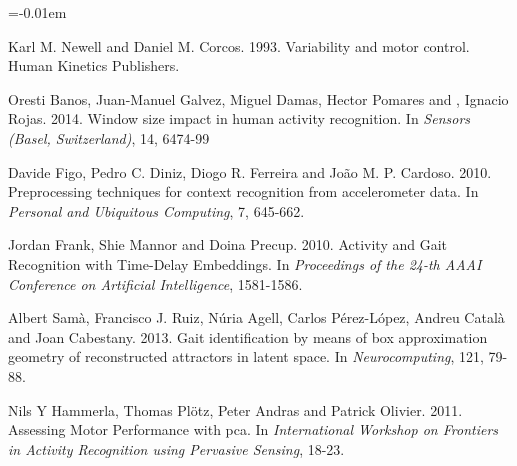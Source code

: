\documentclass[a0paper,portrait]{baposter}
\begin{document}
\begin{poster}
{\begin{thebibliography}{1}
\itemsep=-0.01em
\setlength{\baselineskip}{0.4em}

  Karl M. Newell and Daniel M. Corcos. 1993.
  \newblock Variability and motor control.
  \newblock Human Kinetics Publishers.
  
  
   Oresti Banos, Juan-Manuel Galvez, Miguel Damas, Hector Pomares and , Ignacio Rojas. 2014.
   \newblock Window size impact in human activity recognition.
   \newblock In {\em Sensors (Basel, Switzerland)}, 14, 6474-99

   
  Davide Figo, Pedro C. Diniz, Diogo R. Ferreira and João M. P. Cardoso. 2010.
  \newblock Preprocessing techniques for context recognition from accelerometer data.
  \newblock In {\em Personal and Ubiquitous Computing}, 7, 645-662.
  
  
  Jordan Frank, Shie Mannor and Doina Precup. 2010. 
  \newblock Activity and Gait Recognition with Time-Delay Embeddings.
  \newblock In {\em Proceedings of the 24-th AAAI Conference on Artificial Intelligence}, 1581-1586.
  
  Albert Samà, Francisco J. Ruiz, Núria Agell, Carlos Pérez-López, Andreu Català and Joan Cabestany. 2013.
  \newblock Gait identification by means of box approximation geometry of reconstructed attractors in latent space.
  \newblock In {\em Neurocomputing}, 121, 79-88.

  
  Nils Y Hammerla, Thomas Plötz, Peter Andras and Patrick Olivier. 2011.
  \newblock Assessing Motor Performance with pca.
  \newblock In {\em International Workshop on Frontiers in Activity Recognition using Pervasive Sensing}, 18-23.

  

\end{thebibliography}
}

\end{poster}
\end{document}
